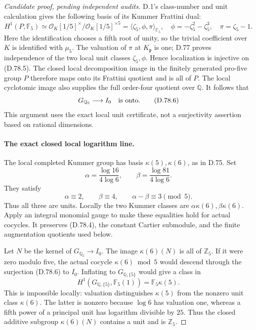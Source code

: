 \begin{proof}[Candidate proof, pending independent audits]
D.1's class-number and unit calculation gives the following
basis of its Kummer Frattini dual:
\[
 H^1(P,\mathbb F_5)
  \simeq\mathcal O_K[1/5]^\times/
                    \mathcal O_K[1/5]^{\times5}
  =\langle\zeta_5,\phi,\pi\rangle_{\mathbb F_5},
 \quad \phi=-\zeta_5^2-\zeta_5^3,\quad \pi=\zeta_5-1.
                                                               \tag{D.78.5}
\]
Here the identification chooses a fifth root of unity, so the
trivial coefficient over \(K\) is identified with \(\mu_5\).
The valuation of \(\pi\) at \(K_{\mathfrak p}\) is one; D.77
proves independence of the two local unit classes
\(\zeta_5,\phi\). Hence localization is injective on (D.78.5).
The closed local decomposition image in the finitely generated
pro-five group \(P\) therefore maps onto its Frattini quotient
and is all of \(P\). The local cyclotomic image also supplies
the full order-four quotient over \(\mathbb Q\).
It follows that
\[
                G_{\mathbb Q_5}\longrightarrow I_0
                         \quad\hbox{is onto}.           \tag{D.78.6}
\]
This argument uses the exact local unit certificate, not a
surjectivity assertion based on rational dimensions.

\paragraph{The exact closed local logarithm line.}
The local completed Kummer group has basis
\(\kappa(5),\kappa(6)\), as in D.75. Set
\[
 \alpha=\frac{\log16}{4\log6},\qquad
 \beta=\frac{\log81}{4\log6}.
                                                               \tag{D.78.7}
\]
They satisfy
\[
 \alpha\equiv2,\qquad \beta\equiv4,\qquad
                    \alpha-\beta\equiv3\pmod5.
                                                               \tag{D.78.8}
\]
Thus all three are units. Locally the two Kummer classes are
\(\alpha\kappa(6),\beta\kappa(6)\). Apply an integral monomial
gauge to make these equalities hold for actual cocycles.
It preserves (D.78.4), the constant Cartier submodule, and the
finite augmentation quotients used below.

Let \(N\) be the kernel of \(G_{\mathbb Q_5}\to I_0\).
The image \(\kappa(6)(N)\) is all of \(\mathbb Z_5\).
If it were zero modulo five, the actual cocycle
\(\kappa(6)\bmod5\) would descend through the surjection
(D.78.6) to \(I_0\). Inflating to \(G_{\mathbb Q,\{5\}}\)
would give a class in
\[
 H^1(G_{\mathbb Q,\{5\}},\mathbb F_5(1))
                       =\mathbb F_5\kappa(5).
 \]
This is impossible locally: valuation distinguishes
\(\kappa(5)\) from the nonzero unit class \(\kappa(6)\).
The latter is nonzero because \(\log6\) has valuation one,
whereas a fifth power of a principal unit has logarithm
divisible by \(25\). Thus the closed additive subgroup
\(\kappa(6)(N)\) contains a unit and is \(\mathbb Z_5\).


\end{proof}
